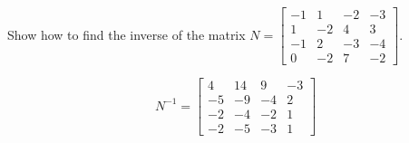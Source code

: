 
\begin{exerciseStatement}


Show how to find the inverse of the matrix \(N= \left[\begin{array}{cccc}
-1 & 1 & -2 & -3 \\
1 & -2 & 4 & 3 \\
-1 & 2 & -3 & -4 \\
0 & -2 & 7 & -2
\end{array}\right] \).


\end{exerciseStatement}
    
\begin{exerciseAnswer} 
\[N^{-1}= \left[\begin{array}{cccc}
4 & 14 & 9 & -3 \\
-5 & -9 & -4 & 2 \\
-2 & -4 & -2 & 1 \\
-2 & -5 & -3 & 1
\end{array}\right] \]
\end{exerciseAnswer}
    
